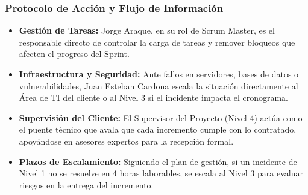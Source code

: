 \subsubsection*{Protocolo de Acción y Flujo de Información}
\begin{itemize}
    \item \textbf{Gestión de Tareas:} Jorge Araque, en su rol de Scrum Master, es el responsable directo de controlar la carga de tareas y remover bloqueos que afecten el progreso del Sprint.
    \item \textbf{Infraestructura y Seguridad:} Ante fallos en servidores, bases de datos o vulnerabilidades, Juan Esteban Cardona escala la situación directamente al Área de TI del cliente o al Nivel 3 si el incidente impacta el cronograma.
    \item \textbf{Supervisión del Cliente:} El Supervisor del Proyecto (Nivel 4) actúa como el puente técnico que avala que cada incremento cumple con lo contratado, apoyándose en asesores expertos para la recepción formal.
    \item \textbf{Plazos de Escalamiento:} Siguiendo el plan de gestión, si un incidente de Nivel 1 no se resuelve en 4 horas laborables, se escala al Nivel 3 para evaluar riesgos en la entrega del incremento.
\end{itemize}
